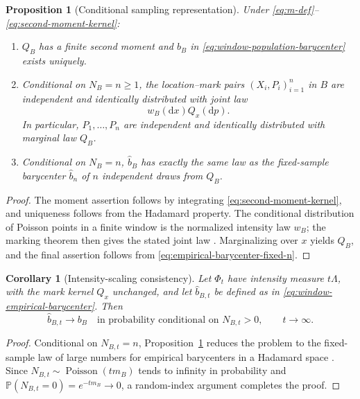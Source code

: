 \documentclass[11pt,a4paper]{article}
\newtheorem{proposition}[theorem]{Proposition}
\newtheorem{corollary}[theorem]{Corollary}
\theoremstyle{remark}
\newcommand{\PP}{\mathbb P}
\begin{document}
\begin{proposition}[Conditional sampling representation]
\label{prop:conditional-iid}
Under \eqref{eq:m-def}--\eqref{eq:second-moment-kernel}:
\begin{enumerate}[label=(\roman*)]
\item \(Q_B\) has a finite second moment and \(b_B\) in \eqref{eq:window-population-barycenter} exists uniquely.
\item Conditional on \(N_B=n\ge1\), the location--mark pairs \((X_i,P_i)_{i=1}^n\) in \(B\) are independent and identically distributed with joint law
\[
 w_B(\mathrm dx)Q_x(\mathrm dp).
\]
In particular, \(P_1,\ldots,P_n\) are independent and identically distributed with marginal law \(Q_B\).
\item Conditional on \(N_B=n\), \(\widehat b_B\) has exactly the same law as the fixed-sample barycenter \(\widehat b_n\) of \(n\) independent draws from \(Q_B\).
\end{enumerate}
\end{proposition}

\begin{proof}
The moment assertion follows by integrating \eqref{eq:second-moment-kernel}, and uniqueness follows from the Hadamard property.  The conditional distribution of Poisson points in a finite window is the normalized intensity law \(w_B\); the marking theorem then gives the stated joint law \cite{kingman1993,lastpenrose2017,chiu2013}.  Marginalizing over \(x\) yields \(Q_B\), and the final assertion follows from \eqref{eq:empirical-barycenter-fixed-n}.
\end{proof}

\begin{corollary}[Intensity-scaling consistency]
\label{cor:intensity-consistency}
Let \(\Phi_t\) have intensity measure \(t\Lambda\), with the mark kernel \(Q_x\) unchanged, and let \(\widehat b_{B,t}\) be defined as in \eqref{eq:window-empirical-barycenter}.  Then
\[
 \widehat b_{B,t}\longrightarrow b_B
 \quad\text{in probability conditional on }N_{B,t}>0,
 \qquad t\to\infty.
\]
\end{corollary}

\begin{proof}
Conditional on \(N_{B,t}=n\), Proposition~\ref{prop:conditional-iid} reduces the problem to the fixed-sample law of large numbers for empirical barycenters in a Hadamard space \cite{sturm2003}.  Since \(N_{B,t}\sim\operatorname{Poisson}(tm_B)\) tends to infinity in probability and \(\PP(N_{B,t}=0)=e^{-tm_B}\to0\), a random-index argument completes the proof.
\end{proof}
\end{document}
